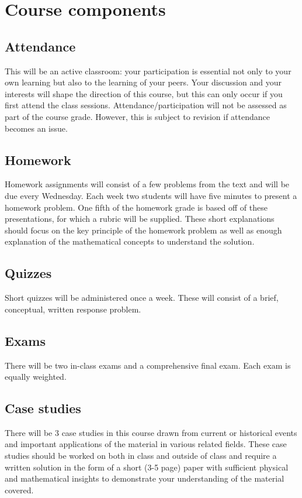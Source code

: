 \documentclass{syllabus}
\begin{document}
\section*{Course components}

\subsection*{Attendance}
This will be an active classroom: your participation is essential not only to your own learning but also to the learning of your peers. Your discussion and your interests will shape the direction of this course, but this can only occur if you first attend the class sessions. Attendance/participation will not be assessed as part of the course grade. However, this is subject to revision if attendance becomes an issue.

\subsection{Homework} 
Homework assignments will consist of a few problems from the text and will be due every Wednesday. Each week two students will have five minutes to present a homework problem. One fifth of the homework grade is based off of these presentations, for which a rubric will be supplied. These short explanations should focus on the key principle of the homework problem as well as enough explanation of the mathematical concepts to understand the solution. 

\subsection{Quizzes} Short quizzes will be administered once a week. These will consist of a brief, conceptual, written response problem. 

\subsection{Exams} There will be two in-class exams and a comprehensive final exam. Each exam is equally weighted. 


\subsection{Case studies}
There will be 3 case studies in this course drawn from current or historical events and important applications of the material in various related fields. These case studies should be worked on both in class and outside of class and require a written solution in the form of a short (3-5 page) paper with sufficient physical and mathematical insights to demonstrate your understanding of the material covered. 
\end{document}
